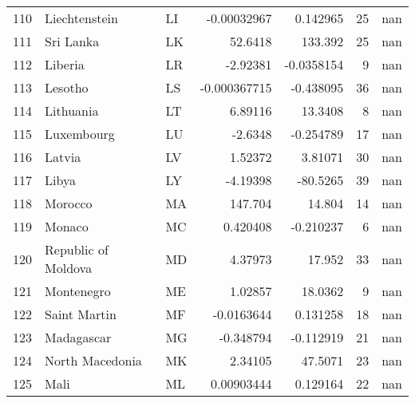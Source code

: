 \begin{tabular}{rllrrrr}
 110 & Liechtenstein                                  & LI         &   -0.00032967  &     0.142965   &     25 &          nan \\
 111 & Sri Lanka                                      & LK         &   52.6418      &   133.392      &     25 &          nan \\
 112 & Liberia                                        & LR         &   -2.92381     &    -0.0358154  &      9 &          nan \\
 113 & Lesotho                                        & LS         &   -0.000367715 &    -0.438095   &     36 &          nan \\
 114 & Lithuania                                      & LT         &    6.89116     &    13.3408     &      8 &          nan \\
 115 & Luxembourg                                     & LU         &   -2.6348      &    -0.254789   &     17 &          nan \\
 116 & Latvia                                         & LV         &    1.52372     &     3.81071    &     30 &          nan \\
 117 & Libya                                          & LY         &   -4.19398     &   -80.5265     &     39 &          nan \\
 118 & Morocco                                        & MA         &  147.704       &    14.804      &     14 &          nan \\
 119 & Monaco                                         & MC         &    0.420408    &    -0.210237   &      6 &          nan \\
 120 & Republic of Moldova                            & MD         &    4.37973     &    17.952      &     33 &          nan \\
 121 & Montenegro                                     & ME         &    1.02857     &    18.0362     &      9 &          nan \\
 122 & Saint Martin                                   & MF         &   -0.0163644   &     0.131258   &     18 &          nan \\
 123 & Madagascar                                     & MG         &   -0.348794    &    -0.112919   &     21 &          nan \\
 124 & North Macedonia                                & MK         &    2.34105     &    47.5071     &     23 &          nan \\
 125 & Mali                                           & ML         &    0.00903444  &     0.129164   &     22 &          nan \\

\end{tabular}
